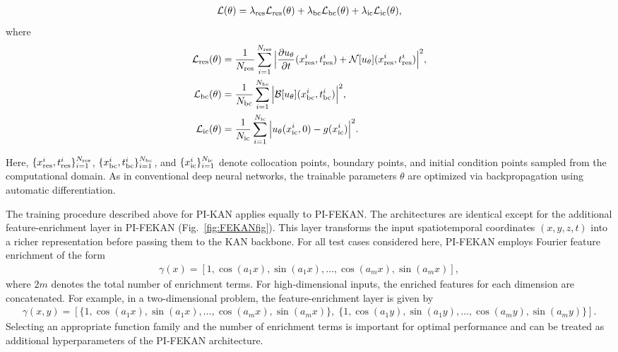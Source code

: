 \documentclass{article}
\begin{document}
\begin{align}
\mathcal{L}(\theta) = \lambda_{\rm res} \mathcal{L}_{\rm res}(\theta) + \lambda_{\rm bc} \mathcal{L}_{\rm bc}(\theta) + \lambda_{\rm ic} \mathcal{L}_{\rm ic}(\theta),
\end{align}
where
\begin{align}
\mathcal{L}_{\rm res}(\theta) &= \frac{1}{N_{\rm res}} \sum_{i=1}^{N_{\rm res}} \Big|\frac{\partial u_{\theta}}{\partial t} (x^i_{\rm res}, t^i_{\rm res}) + \mathcal{N}[u_{\theta}](x^i_{\rm res}, t^i_{\rm res}) \Big|^2, \\
\mathcal{L}_{\rm bc}(\theta) &= \frac{1}{N_{\rm bc}} \sum_{i=1}^{N_{\rm bc}} \Big|\mathcal{B}[u_{\theta}](x^i_{\rm bc}, t^i_{\rm bc})\Big|^2, \\
\mathcal{L}_{\rm ic}(\theta) &= \frac{1}{N_{\rm ic}} \sum_{i=1}^{N_{\rm ic}} \Big|u_{\theta}(x^i_{\rm ic},0) - g(x^i_{\rm ic})\Big|^2.
\end{align}

Here, $\{x^i_{\rm res}, t^i_{\rm res}\}_{i=1}^{N_{\rm res}}$, $\{x^i_{\rm bc}, t^i_{\rm bc}\}_{i=1}^{N_{\rm bc}}$, and $\{x^i_{\rm ic}\}_{i=1}^{N_{\rm ic}}$ denote collocation points, boundary points, and initial condition points sampled from the computational domain. As in conventional deep neural networks, the trainable parameters $\theta$ are optimized via backpropagation using automatic differentiation.


The training procedure described above for PI-KAN applies equally to PI-FEKAN. The architectures are identical except for the additional feature-enrichment layer in PI-FEKAN (Fig.~\ref{fig:FEKANfig}). This layer transforms the input spatiotemporal coordinates $(x, y, z, t)$ into a richer representation before passing them to the KAN backbone. 
For all test cases considered here, PI-FEKAN employs Fourier feature enrichment of the form
\begin{align}
\label{eq:feature_enrich}
\gamma(x) = [1, \cos(a_1 x), \sin(a_1 x), \dots, \cos(a_m x), \sin(a_m x)],
\end{align}
where $2m$ denotes the total number of enrichment terms. For high-dimensional inputs, the enriched features for each dimension are concatenated. For example, in a two-dimensional problem, the feature-enrichment layer is given by
\begin{align}
\label{eq:feature_enrich2}
\gamma(x,y) = [
\{1, \cos(a_1 x), \sin(a_1 x), \dots, \cos(a_m x), \sin(a_m x)\}, \;
\{1, \cos(a_1 y), \sin(a_1 y), \dots, \cos(a_m y), \sin(a_m y)\}].
\end{align}
Selecting an appropriate function family and the number of enrichment terms is important for optimal performance and can be treated as additional hyperparameters of the PI-FEKAN architecture.
\end{document}

